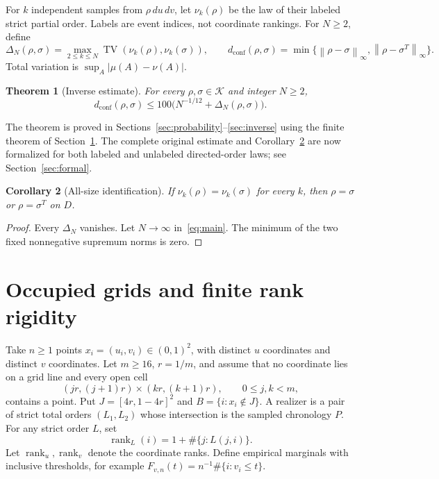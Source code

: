 \documentclass[11pt]{article}
\newtheorem{theorem}{Theorem}[section]
\newtheorem{corollary}[theorem]{Corollary}
\theoremstyle{remark}
\newcommand{\K}{\mathcal K}
\newcommand{\TV}{\operatorname{TV}}
\newcommand{\dc}{d_{\mathrm{conf}}}
\newcommand{\rank}{\operatorname{rank}}
\newcommand{\norm}[1]{\left\lVert #1\right\rVert_\infty}
\begin{document}
For $k$ independent samples from $\rho\,du\,dv$, let $\nu_k(\rho)$ be
the law of their labeled strict partial order. Labels are event indices,
not coordinate rankings. For $N\ge2$, define
\[
 \Delta_N(\rho,\sigma)=\max_{2\le k\le N}
       \TV(\nu_k(\rho),\nu_k(\sigma)),\qquad
 \dc(\rho,\sigma)=\min\{\norm{\rho-\sigma},\norm{\rho-\sigma^T}\}.
\]
Total variation is $\sup_A|\mu(A)-\nu(A)|$.

\begin{theorem}[Inverse estimate]\label{thm:main}
For every $\rho,\sigma\in\K$ and integer $N\ge2$,
\begin{equation}\label{eq:main}
 \dc(\rho,\sigma)\le100\bigl(N^{-1/12}+\Delta_N(\rho,\sigma)\bigr).
\end{equation}
\end{theorem}
The theorem is proved in Sections~\ref{sec:probability}--\ref{sec:inverse}
using the finite theorem of Section~\ref{sec:finite}. The complete
original estimate and Corollary~\ref{cor:identification} are now formalized
for both labeled and unlabeled directed-order laws; see
Section~\ref{sec:formal}.

\begin{corollary}[All-size identification]\label{cor:identification}
If $\nu_k(\rho)=\nu_k(\sigma)$ for every $k$, then
$\rho=\sigma$ or $\rho=\sigma^T$ on $D$.
\end{corollary}
\begin{proof}
Every $\Delta_N$ vanishes. Let $N\to\infty$ in~\eqref{eq:main}.
The minimum of the two fixed nonnegative supremum norms is zero.
\end{proof}

\section{Occupied grids and finite rank rigidity}\label{sec:finite}
Take $n\ge1$ points $x_i=(u_i,v_i)\in(0,1)^2$, with distinct $u$
coordinates and distinct $v$ coordinates. Let $m\ge16$, $r=1/m$,
and assume that no coordinate lies on a grid line and every open cell
\[
 (jr,(j+1)r)\times(kr,(k+1)r),\qquad 0\le j,k<m,
\]
contains a point. Put $J=[4r,1-4r]^2$ and
$B=\{i:x_i\notin J\}$. A realizer is a pair of strict total orders
$(L_1,L_2)$ whose intersection is the sampled chronology $P$.
For any strict order $L$, set
\[
 \rank_L(i)=1+\#\{j:L(j,i)\}.
\]
Let $\rank_u,\rank_v$ denote the coordinate ranks. Define empirical
marginals with inclusive thresholds, for example
$F_{v,n}(t)=n^{-1}\#\{i:v_i\le t\}$.
\end{document}
